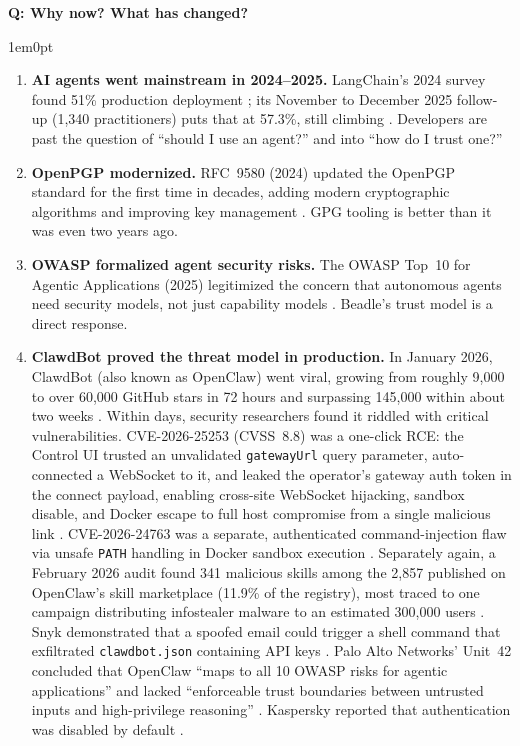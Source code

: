 \documentclass[11pt,letterpaper]{article}
\newcounter{faqnum}
\newenvironment{faqpair}[1]{%
  \needspace{4\baselineskip}%
  \vspace{0.5em}%
  \refstepcounter{faqnum}%
  \noindent\textbf{\color{SectionBlue}Q\thefaqnum: #1}\par\nopagebreak[4]%
  \vspace{0.2em}%
  \begin{adjustwidth}{1em}{0pt}%
  \setlength{\parindent}{0pt}%
}{%
  \end{adjustwidth}%
  \vspace{0.5em}%
}
\begin{document}
\begin{faqpair}{Why now? What has changed?}
  \begin{enumerate}[nosep]
    \item \textbf{AI agents went mainstream in 2024--2025.} LangChain's 2024
      survey found 51\% production deployment \cite{langchain2024agents}; its
      November to December 2025 follow-up (1,340 practitioners) puts that at
      57.3\%, still climbing \cite{langchain2025agenteng}. Developers are past
      the question of ``should I use an agent?'' and into ``how do I trust
      one?''
    \item \textbf{OpenPGP modernized.} RFC~9580 (2024) updated the OpenPGP
      standard for the first time in decades, adding modern cryptographic
      algorithms and improving key management \cite{rfc9580}. GPG tooling is
      better than it was even two years ago.
    \item \textbf{OWASP formalized agent security risks.} The OWASP Top~10 for
      Agentic Applications (2025) legitimized the concern that autonomous agents
      need security models, not just capability models
      \cite{owasp2025agentic}. Beadle's trust model is a direct response.
    \item \textbf{ClawdBot proved the threat model in production.} In January
      2026, ClawdBot (also known as OpenClaw) went viral, growing from
      roughly 9,000 to over 60,000 GitHub stars in 72 hours and surpassing
      145,000 within about two weeks \cite{cnbc2026openclawstars}. Within
      days, security researchers found it riddled with critical
      vulnerabilities. CVE-2026-25253 (CVSS~8.8) was a one-click RCE: the
      Control UI trusted an unvalidated \texttt{gatewayUrl} query parameter,
      auto-connected a WebSocket to it, and leaked the operator's gateway
      auth token in the connect payload, enabling cross-site WebSocket
      hijacking, sandbox disable, and Docker escape to full host compromise
      from a single malicious link \cite{socradar2026cve25253,
      thn2026openclawrce}. CVE-2026-24763 was a separate, authenticated
      command-injection flaw via unsafe \texttt{PATH} handling in Docker
      sandbox execution \cite{ghsa2026mc68clawdocker}. Separately again, a
      February 2026 audit found 341 malicious skills among the 2,857
      published on OpenClaw's skill marketplace (11.9\% of the registry),
      most traced to one campaign distributing infostealer malware to an
      estimated 300,000 users \cite{koisecurity2026clawhub}. Snyk
      demonstrated that a spoofed email could trigger a shell command that
      exfiltrated \texttt{clawdbot.json} containing API keys
      \cite{snyk2026_clawdbot}. Palo Alto Networks' Unit~42 concluded that
      OpenClaw ``maps to all 10 OWASP risks for agentic applications'' and
      lacked ``enforceable trust boundaries between untrusted inputs and
      high-privilege reasoning'' \cite{unit42_2026_openclaw}. Kaspersky
      reported that authentication was disabled by default
      \cite{kaspersky2026_openclaw}.


\end{enumerate}
\end{faqpair}
\end{document}
